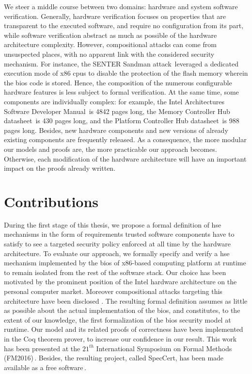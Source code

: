 We steer a middle course between two domains: hardware and system software
verification.
%
Generally, hardware verification focuses on properties that are transparent to
the executed software, and require no configuration from its part, while
software verification abstract as much as possible of the hardware architecture
complexity.
%
However, compositional attacks can come from unsuspected places, with no apparent link
with the considered security mechanism.
%
For instance, the SENTER Sandman attack\,\cite{kovah2015senter} leveraged a
dedicated execution mode of x86 \acp{cpu} to disable the protection of the flash
memory wherein the \ac{bios} code is stored.
%
Hence, the composition of the numerous configurable hardware features is less
subject to formal verification.
%
At the same time, some components are individually complex: for example, the
Intel Architectures Software Developer Manual\,\cite{intel2014manual} is 4842
pages long, the Memory Controller Hub datasheet\,\cite{intel2009mch} is 430
pages long, and the Platform Controller Hub datasheet\,\cite{intel2012pch} is
988 pages long.
%
Besides, new hardware components and new versions of already existing components
are frequently released.
%
As a consequence, the more modular our models and proofs are, the more
practicable our approach becomes.
%
Otherwise, each modification of the hardware architecture will have an important
impact on the proofs already written.

\section{Contributions}

During the first stage of this thesis, we propose a formal definition of
\ac{hse} mechanisms in the form of requirements trusted software components have
to satisfy to see a targeted security policy enforced at all time by the
hardware architecture. 
%
To evaluate our approach, we formally specify and verify a \ac{hse} mechanism
implemented by the \ac{bios} of x86-based computing platform at runtime to
remain isolated from the rest of the software stack.
%
Our choice has been motivated by the prominent position of the Intel hardware
architecture on the personal computer market. Moreover compositional attacks targeting this architecture have been
 disclosed .
%
The resulting formal definition assumes as little as possible about the actual
implementation of the \ac{bios}, and constitutes, to the extent of our
knowledge, the first formalization  of the \ac{bios} security model at runtime.
%
Our model and its related proofs of correctness have been implemented in the Coq
theorem prover, to increase our confidence in our result.
%
This work has been presented at the $21^{th}$ International Symposium on Formal
Methods (FM2016)\,\cite{letan2016speccert}.
%
Besides, the resulting project, called SpecCert, has been made available as a
free software\,\cite{letan2016speccertcode}.

